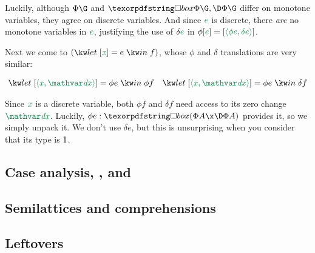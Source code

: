 \noindent
Luckily, although $\Phi\G$ and $\iso\Phi\G,\DP\G$ differ on monotone variables,
they agree on discrete variables. And since $\isocolor e$ is discrete, there
\emph{are} no monotone variables in $\isocolor e$, justifying the use of
$\delta\isocolor e$ in $\phi\ebox{e} = \ebox{\etuple{\phi e, \delta e}}$.

Next we come to $(\eletbox x e f)$, whose $\phi$ and $\delta$ translations are
very similar:

\begin{align*}
  \elet{\ebox{\etuple{\dvar x,\dvar\dx}} = \phi e} \phi f
  &&
  \elet{\ebox{\etuple{\dvar x,\dvar\dx}} = \phi e} \delta f
\end{align*}

\noindent
Since $\dvar x$ is a discrete variable, both $\phi f$ and $\delta f$ need access
to its zero change $\dvar\dx$. Luckily, $\phi e : \iso(\Phi A \x \DP A)$
provides it, so we simply unpack it. We don't use $\delta e$, but this is
unsurprising when you consider that its type is $1$.


\subsection{Case analysis, , and }



\subsection{Semilattices and comprehensions}




\subsection{Leftovers}

